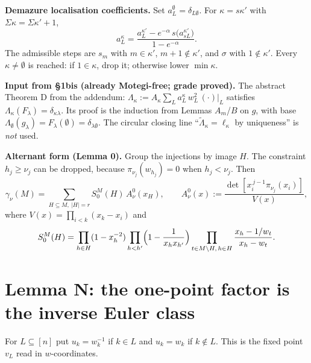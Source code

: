 \documentclass[11pt]{article}
\newcommand{\gr}[1]{\textsf{#1}}
\theoremstyle{remark}
\begin{document}
\textbf{Demazure localisation coefficients.} Set $a^\emptyset_L=\delta_{L\emptyset}$. For $\kappa=s\kappa'$ with
$\Sigma\kappa=\Sigma\kappa'+1$,
\begin{equation}\label{rec}
a^\kappa_L=\frac{a^{\kappa'}_L-e^{-\alpha}\,s\big(a^{\kappa'}_{sL}\big)}{1-e^{-\alpha}}.
\end{equation}
The admissible steps are $s_m$ with $m\in\kappa'$, $m+1\notin\kappa'$, and $\sigma$ with $1\notin\kappa'$. Every
$\kappa\neq\emptyset$ is reached: if $1\in\kappa$, drop it; otherwise lower $\min\kappa$.

\textbf{Input from \S1bis (already Motegi-free; grade \gr{proved}).} The abstract Theorem D from the addendum:
$\Lambda_\kappa:=A_\kappa\sum_La^\kappa_L\,w_L^2\,(\cdot)|_L$ satisfies $\Lambda_\kappa(F_\lambda)=\delta_{\kappa\lambda}$.
Its proof is the induction from Lemmas $A_m$/$B$ on $g$, with base $\Lambda_\emptyset(g_\lambda)=F_\lambda(\emptyset)=\delta_{\lambda\emptyset}$.
The circular closing line ``$\tilde\Lambda_\kappa=\ell_\kappa$ by uniqueness'' is \emph{not} used.

\textbf{Alternant form (Lemma 0).} Group the injections by image $H$. The constraint $h_j\ge\nu_j$ can be dropped,
because $\pi_{\nu_j}(w_{h_j})=0$ when $h_j<\nu_j$. Then
\[
\gamma_\nu(M)=\sum_{H\subseteq M,\ |H|=r}S_0^M(H)\,A^0_\nu(x_H),\qquad
A^0_\nu(x):=\frac{\det[x_i^{\,j-1}\pi_{\nu_j}(x_i)]}{V(x)},
\]
where $V(x)=\prod_{i<k}(x_k-x_i)$ and
\[
S_0^M(H)=\prod_{h\in H}(1-x_h^{-2})\prod_{h<h'}\Bigl(1-\frac1{x_hx_{h'}}\Bigr)\prod_{t\in M\setminus H,\,h\in H}\frac{x_h-1/w_t}{x_h-w_t}.
\]

\section{Lemma N: the one-point factor is the inverse Euler class}
For $L\subseteq[n]$ put $u_k=w_k^{-1}$ if $k\in L$ and $u_k=w_k$ if $k\notin L$. This is the fixed point $v_L$ read
in $w$-coordinates.
\end{document}
